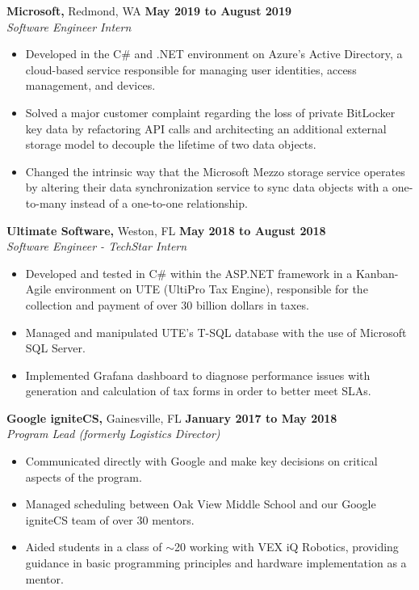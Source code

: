 \documentclass[11pt]{article} %
\begin{document}
		\noindent \textbf{Microsoft,} Redmond, WA \hfill\textbf{May 2019 to August 2019}\\
		\textit{Software Engineer Intern}
		\begin{itemize}[noitemsep,nolistsep, label = {-}]
			\item Developed in the C\# and .NET environment on Azure's Active Directory, a cloud-based service responsible for managing user identities, access management, and devices.
			\item Solved a major customer complaint regarding the loss of private BitLocker key data by refactoring API calls and architecting an additional external storage model to decouple the lifetime of two data objects.
			\item Changed the intrinsic way that the Microsoft Mezzo storage service operates by altering their data synchronization service to sync data objects with a one-to-many instead of a one-to-one relationship.
		\end{itemize}
	
		\vspace{.20cm}
		
		\noindent \textbf{Ultimate Software,} Weston, FL \hfill\textbf{May 2018 to August 2018}\\
		\textit{Software Engineer - TechStar Intern}
		\begin{itemize}[noitemsep,nolistsep, label = {-}]
			\item Developed and tested in C\# within the ASP.NET framework in a Kanban-Agile environment on UTE (UltiPro Tax Engine), responsible for the collection and payment of over 30 billion dollars in taxes.
			\item Managed and manipulated UTE's T-SQL database with the use of Microsoft SQL Server.
			\item Implemented Grafana dashboard to diagnose performance issues with generation and calculation of tax forms in order to better meet SLAs.
		\end{itemize}
		\vspace{.20cm}
		
		\noindent \textbf{Google igniteCS,} Gainesville, FL \hfill\textbf{January 2017 to May 2018}\\
		\textit{Program Lead (formerly Logistics Director)}
		\begin{itemize}[noitemsep,nolistsep, label = {-}]
			\item Communicated directly with Google and make key decisions on critical aspects of the program.
			\item Managed scheduling between Oak View Middle School and our Google igniteCS team of over 30 mentors.
			\item Aided students in a class of $\sim$20 working with VEX iQ Robotics, providing guidance in basic programming principles and hardware implementation as a mentor.
		\end{itemize} 
		\vspace{.20cm}
		
\end{document}
